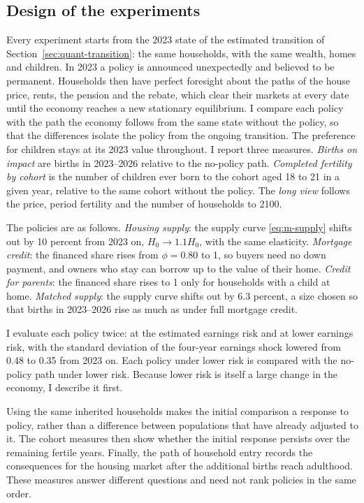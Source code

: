 \subsection{Design of the experiments}
\label{sec:policy-design}

Every experiment starts from the 2023 state of the estimated transition of
Section~\ref{sec:quant-transition}: the same households, with the same
wealth, homes and children. In 2023 a policy is announced unexpectedly and
believed to be permanent. Households then have perfect foresight about the
paths of the house price, rents, the pension and the rebate, which clear their
markets at every date until the economy reaches a new stationary equilibrium.
I compare each policy with the path the economy follows from the same state
without the policy, so that the differences isolate the policy from the
ongoing transition. The preference for children stays at its 2023 value
throughout. I report three measures. \emph{Births on impact} are births in
2023--2026 relative to the no-policy path. \emph{Completed fertility by
cohort} is the number of children ever born to the cohort aged 18 to 21 in a
given year, relative to the same cohort without the policy. The \emph{long
view} follows the price, period fertility and the number of households to
2100.

The policies are as follows. \emph{Housing supply}: the supply curve
\eqref{eq:m-supply} shifts out by 10 percent from 2023 on, $H_0\to1.1H_0$,
with the same elasticity. \emph{Mortgage credit}: the financed share rises
from $\phi=0.80$ to 1, so buyers need no down payment, and owners who stay can
borrow up to the value of their home. \emph{Credit for parents}: the financed
share rises to 1 only for households with a child at home. \emph{Matched
supply}: the supply curve shifts out by 6.3 percent, a size chosen so that
births in 2023--2026 rise as much as under full mortgage credit.

I evaluate each policy twice: at the estimated earnings risk and at lower
earnings risk, with the standard deviation of the four-year earnings shock
lowered from 0.48 to 0.35 from 2023 on. Each policy under lower risk is
compared with the no-policy path under lower risk. Because lower risk is
itself a large change in the economy, I describe it first.

Using the same inherited households makes the initial comparison a response
to policy, rather than a difference between populations that have already
adjusted to it. The cohort measures then show whether the initial response
persists over the remaining fertile years. Finally, the path of household
entry records the consequences for the housing market after the additional
births reach adulthood. These measures answer different questions and need
not rank policies in the same order.

